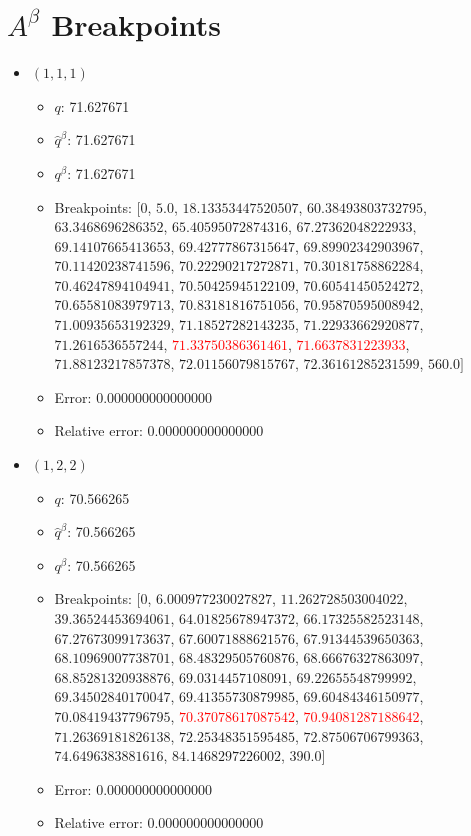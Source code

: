 \documentclass{article}%
\begin{document}
\section{$A^\beta$ Breakpoints}%
\thispagestyle{plain}%
\begin{itemize}%
	\item $(1, 1, 1)$%
	\begin{itemize}%
		\item $q$: 71.627671%
		\item $\hat{q}^\beta$: 71.627671%
		\item $q^\beta$: 71.627671%
		\item Breakpoints: $[$$0$, $5.0$, $18.13353447520507$, $60.38493803732795$, $63.3468696286352$, $65.40595072874316$, $67.27362048222933$, $69.14107665413653$, $69.42777867315647$, $69.89902342903967$, $70.11420238741596$, $70.22290217272871$, $70.30181758862284$, $70.46247894104941$, $70.50425945122109$, $70.60541450524272$, $70.65581083979713$, $70.83181816751056$, $70.95870595008942$, $71.00935653192329$, $71.18527282143235$, $71.22933662920877$, $71.2616536557244$, \textcolor{red}{$71.33750386361461$}, \textcolor{red}{$71.6637831223933$}, $71.88123217857378$, $72.01156079815767$, $72.36161285231599$, $560.0$$]$%
		\item Error: 0.000000000000000%
		\item Relative error: 0.000000000000000%
	\end{itemize}%
	\item $(1, 2, 2)$%
	\begin{itemize}%
		\item $q$: 70.566265%
		\item $\hat{q}^\beta$: 70.566265%
		\item $q^\beta$: 70.566265%
		\item Breakpoints: $[$$0$, $6.000977230027827$, $11.262728503004022$, $39.36524453694061$, $64.01825678947372$, $66.17325582523148$, $67.27673099173637$, $67.60071888621576$, $67.91344539650363$, $68.10969007738701$, $68.48329505760876$, $68.66676327863097$, $68.85281320938876$, $69.0314457108091$, $69.22655548799992$, $69.34502840170047$, $69.41355730879985$, $69.60484346150977$, $70.08419437796795$, \textcolor{red}{$70.37078617087542$}, \textcolor{red}{$70.94081287188642$}, $71.26369181826138$, $72.25348351595485$, $72.87506706799363$, $74.6496383881616$, $84.1468297226002$, $390.0$$]$%
		\item Error: 0.000000000000000%
		\item Relative error: 0.000000000000000%

\end{itemize}
\end{itemize}
\end{document}
